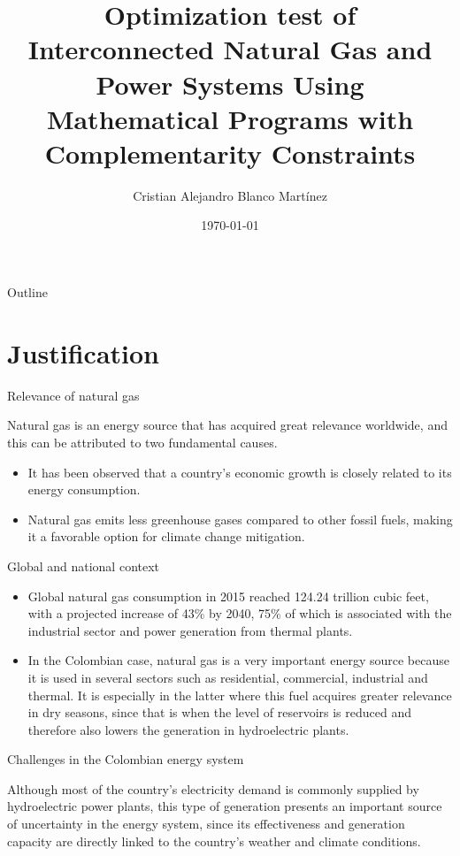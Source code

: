 \documentclass[hyperref={colorlinks,citecolor=blue,linkcolor=blue,urlcolor=blue}]{beamer}
\title[]{Optimization test of Interconnected Natural Gas and Power Systems Using Mathematical Programs with Complementarity Constraints}
\author{Cristian Alejandro Blanco Martínez}
\institute{Universidad Tecnológica de Pereira \\ 
Grupo de investigación Automática}
\date{\today}
\begin{document}
\begin{frame}
  \titlepage
\end{frame}

\begin{frame}{Outline}
  \tableofcontents
\end{frame}

\section{Justification}
\begin{frame}{Relevance of natural gas}

Natural gas is an energy source that has acquired great relevance worldwide, and this can be attributed to two fundamental causes. 

\begin{itemize}
    \item It has been observed that a country's economic growth is closely related to its energy consumption.
    
    \item Natural gas emits less greenhouse gases compared to other fossil fuels, making it a favorable option for climate change mitigation.    
\end{itemize}

\end{frame}


\begin{frame}{Global and national context}

\begin{itemize}
    \item Global natural gas consumption in 2015 reached 124.24 trillion cubic feet, with a projected increase of 43\% by 2040, 75\% of which is associated with the industrial sector and power generation from thermal plants. 
    
    \item In the Colombian case, natural gas is a very important energy source because it is used in several sectors such as residential, commercial, industrial and thermal. It is especially in the latter where this fuel acquires greater relevance in dry seasons, since that is when the level of reservoirs is reduced and therefore also lowers the generation in hydroelectric plants. 

\end{itemize}

\end{frame}

\begin{frame}{Challenges in the Colombian energy system}
    
    Although most of the country's electricity demand is commonly supplied by hydroelectric power plants, this type of generation presents an important source of uncertainty in the energy system, since its effectiveness and generation capacity are directly linked to the country's weather and climate conditions.

      

\end{frame}
\end{document}
